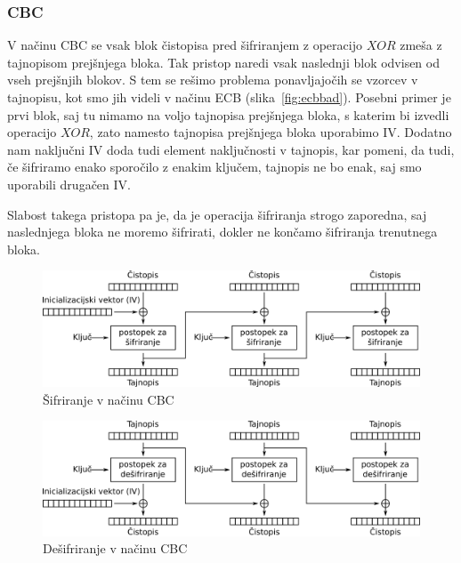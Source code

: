 \documentclass[12pt,a4paper,openany,tikz]{book}
\theoremstyle{plain}
\theoremstyle{definition}
\begin{document}
\subsubsection{CBC}
\label{subs:CBC}

V načinu \Gls{CBC} se vsak blok čistopisa pred šifriranjem z operacijo $XOR$ zmeša z tajnopisom prejšnjega bloka. Tak pristop naredi vsak naslednji blok odvisen od vseh prejšnjih blokov. S tem se rešimo problema ponavljajočih se vzorcev v tajnopisu, kot smo jih videli v načinu \acrshort{ECB} (slika~\ref{fig:ecbbad}). Posebni primer je prvi blok, saj tu nimamo na voljo tajnopisa prejšnjega bloka, s katerim bi izvedli operacijo $XOR$, zato namesto tajnopisa prejšnjega bloka uporabimo \acrfull{IV}. Dodatno nam naključni \gls{IV} doda tudi element naključnosti v tajnopis, kar pomeni, da tudi, če šifriramo enako sporočilo z enakim ključem, tajnopis ne bo enak, saj smo uporabili drugačen \gls{IV}.

Slabost takega pristopa pa je, da je operacija šifriranja strogo zaporedna, saj naslednjega bloka ne moremo šifrirati, dokler ne končamo šifriranja trenutnega bloka.

\begin{figure}[ht!]
  \centering
    \includegraphics[width=\textwidth]{images/CBC_encryption}
    \caption{Šifriranje v načinu \gls{CBC}}
\label{fig:cbcenc}
\end{figure}

\begin{figure}[ht!]
  \centering
    \includegraphics[width=\textwidth]{images/CBC_decryption}
    \caption{Dešifriranje v načinu \gls{CBC}}
\label{fig:cbcdec}
\end{figure}
\end{document}
